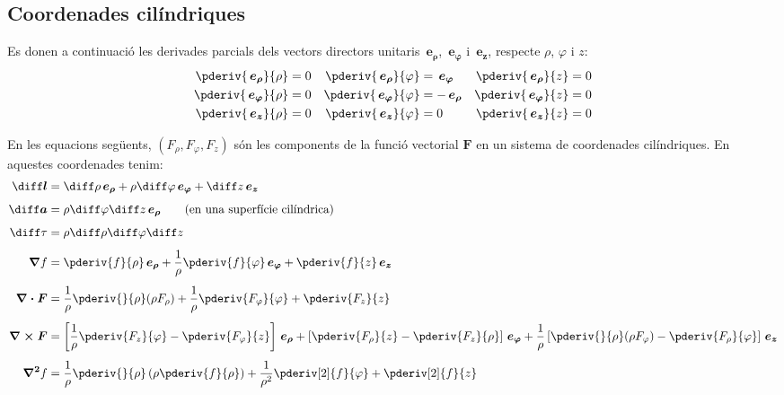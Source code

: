 \documentclass[catalan,a4paper,twoside,11pt]{article}
\begin{document}
\subsection{Coordenades cilíndriques}

\renewcommand{\va}{\ensuremath{\,\boldsymbol{e_\rho}}}
\renewcommand{\vb}{\ensuremath{\,\boldsymbol{e_\varphi}}}
\renewcommand{\vc}{\ensuremath{\,\boldsymbol{e_z}}}

Es donen a continuació les derivades parcials dels vectors directors unitaris $\va$, $\vb$ i $\vc$, respecte $\rho$, $\varphi$ i $z$:
\begin{subequations}
\begin{align}
   \pderiv{\va}{\rho} &= 0 & \pderiv{\va}{\varphi} &= \vb  & \pderiv{\va}{z} &= 0 \\
   \pderiv{\vb}{\rho} &= 0 & \pderiv{\vb}{\varphi} &= -\va & \pderiv{\vb}{z} &= 0 \\
   \pderiv{\vc}{\rho} &= 0 & \pderiv{\vc}{\varphi} &= 0    & \pderiv{\vc}{z} &= 0
\end{align}
\end{subequations}

En les equacions següents, $(F_\rho,F_\varphi,F_z)$  són les
components de la funció vectorial   $\boldsymbol{F}$ en un sistema de
coordenades cilíndriques. En aquestes coordenades tenim:
\begin{align}
    \boldsymbol{\diff l} &= \diff \rho \va + \rho\diff \varphi \vb + \diff z \vc\\[1ex]
    \boldsymbol{\diff a} &= \rho\diff \varphi \diff z \va\qquad\text{(en una superfície cilíndrica)}\\[1ex]
    \diff\tau &= \rho \diff \rho \diff \varphi \diff z\\[1ex]
    \boldsymbol{\nabla}f &= \pderiv{f}{\rho}\va + \frac{1}{\rho}\pderiv{f}{\varphi}\vb
    + \pderiv{f}{z}\vc\\[1ex]
    \boldsymbol{\nabla\cdot F} &= \frac{1}{\rho}\pderiv{}{\rho}(\rho F_\rho) +
    \frac{1}{\rho}\pderiv{F_\varphi}{\varphi}+ \pderiv{F_z}{z}\\[1ex]
    \boldsymbol{\nabla\times F} &= \left[\frac{1}{\rho}\pderiv{F_z}{\varphi}-
    \pderiv{F_\varphi}{z}\right]\va +
    \left[\pderiv{F_\rho}{z}-\pderiv{F_z}{\rho}\right]\vb +
    \frac{1}{\rho}\left[\pderiv{}{\rho}(\rho F_\varphi)-\pderiv{F_\rho}{\varphi}\right]\vc\\[1ex]
    \boldsymbol{\nabla^2}f &= \frac{1}{\rho}\pderiv{}{\rho}\left(\rho\pderiv{f}{\rho}
    \right)
    + \frac{1}{\rho^2}\pderiv[2]{f}{\varphi}+ \pderiv[2]{f}{z}
\end{align}
\end{document}

